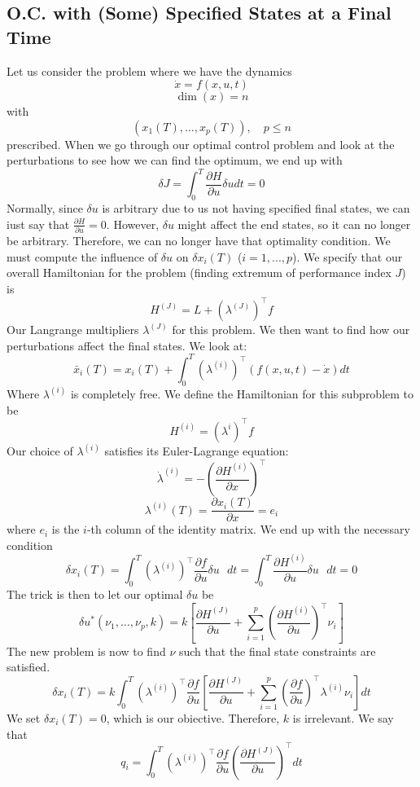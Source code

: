 \documentclass{article}
\begin{document}
\subsection{O.C. with (Some) Specified States at a Final Time}

Let us consider the problem where we have the dynamics
\[\dot{x} = f(x,u,t)\]
\[\dim(x) = n\]
with
\[(x_1(T),\ldots,x_p(T)),\quad p \le n\]
prescribed.
When we go through our optimal control problem and look at the perturbations to see how we
can find the optimum, we end up with
\[\delta J = \int_{0}^{T}\frac{\partial H}{\partial u}\delta u dt = 0\]
Normally, since $\delta u$ is arbitrary due to us not having specified final states,
we can iust say that $\frac{\partial H}{\partial u} = 0$. However, $\delta u$ might affect
the end states, so it can no longer be arbitrary. Therefore, we can no longer have that
optimality condition. We must compute the influence of $\delta u$ on $\delta x_i(T)$ ($i = 1,...,p$).
We specify that our overall Hamiltonian for the problem (finding extremum of performance index
$J$) is
\[H^{(J)} = L + (\lambda^{(J)})^\top f\]
Our Langrange multipliers $\lambda^{(J)}$ for this problem. We then want to
find how our perturbations affect the final states. We look at:
\[\bar{x}_i(T) = x_i(T) + \int_{0}^{T}(\lambda^{(i)})^\top(f(x,u,t)-\dot{x})dt\]
Where $\lambda^{(i)}$ is completely free. We define the Hamiltonian for this subproblem to be
\[H^{(i)} = (\lambda^{i})^\top f\]
Our choice of $\lambda^{(i)}$ satisfies its Euler-Lagrange equation:
\[\dot{\lambda}^{(i)} = -\left(\frac{\partial H^{(i)}}{\partial x}\right)^\top\]
\[\lambda^{(i)}(T) = \frac{\partial x_i(T)}{\partial x} = e_i\]
where $e_i$ is the $i$-th column of the identity matrix. We end up with the necessary condition
\[\delta x_i(T) = \int_{0}^{T}(\lambda^{(i)})^\top \frac{\partial f}{\partial u}\delta u\text{ }dt
= \int_{0}^{T}\frac{\partial H^{(i)}}{\partial u}\delta u\text{ }dt = 0\]
The trick is then to let our optimal $\delta u$ be
\[\delta u^{*}(\nu_1,\ldots,\nu_p,k) = k\left[\frac{\partial H^{(J)}}{\partial u} +
\sum_{i=1}^{p}\left(\frac{\partial H^{(i)}}{\partial u}\right)^\top \nu_i\right]\]
The new problem is now to find $\nu$ such that the final state constraints are satisfied.
\[\delta x_i(T) = k\int_{0}^{T}(\lambda^{(i)})^\top \frac{\partial f}{\partial u}
\left[\frac{\partial H^{(J)}}{\partial u} +
\sum_{i=1}^{p}\left(\frac{\partial f}{\partial u}\right)^\top\lambda^{(i)} \nu_i\right]dt\]
We set $\delta x_i(T) = 0$, which is our obiective. Therefore, $k$ is irrelevant.
We say that
\[q_i = \int_{0}^{T}(\lambda^{(i)})^\top\frac{\partial f}{\partial u}
\left(\frac{\partial H^{(J)}}{\partial u}\right)^\top dt\]
\end{document}
